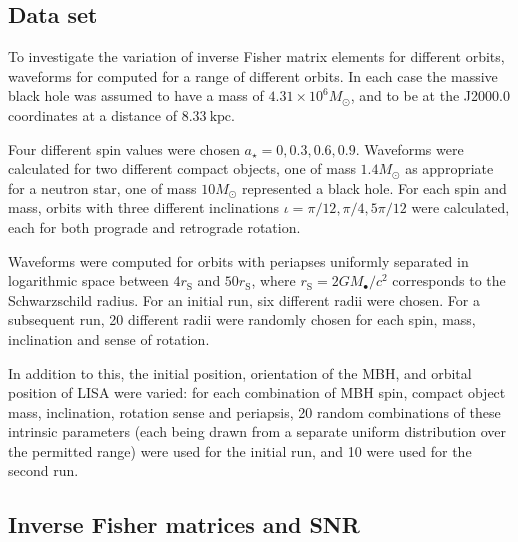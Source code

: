 \documentclass[useAMS,usedcolumn,usegraphicx,usenatbib]{mn2e}
\newcommand{\eqnref}[1]{(\ref{eq:#1})}
\newcommand{\sub}[1]{\ensuremath{_\mathrm{#1}}}
\begin{document}
\subsection{Data set}

To investigate the variation of inverse Fisher matrix elements for different orbits, waveforms for computed for a range of different orbits. In each case the massive black hole was assumed to have a mass of $4.31 \times 10^6 M_\odot$, and to be at the J2000.0 coordinates at a distance of $8.33~\mathrm{kpc}$.

Four different spin values were chosen $a_\star = 0, 0.3, 0.6, 0.9$. Waveforms were calculated for two different compact objects, one of mass $1.4 M_\odot$ as appropriate for a neutron star, one of mass $10 M_\odot$ represented a black hole. For each spin and mass, orbits with three different inclinations $\iota = \pi/12, \pi/4, 5\pi/12$ were calculated, each for both prograde and retrograde rotation.

Waveforms were computed for orbits with periapses uniformly separated in logarithmic space between $4 r\sub{S}$ and $50 r\sub{S}$, where $r\sub{S} = 2 GM_\bullet / c^2$ corresponds to the Schwarzschild radius. For an initial run, six different radii were chosen. For a subsequent run, 20 different radii were randomly chosen for each spin, mass, inclination and sense of rotation.

In addition to this, the initial position, orientation of the MBH, and orbital position of LISA were varied: for each combination of MBH spin, compact object mass, inclination, rotation sense and periapsis, 20 random combinations of these intrinsic parameters (each being drawn from a separate uniform distribution over the permitted range) were used for the initial run, and 10 were used for the second run.

\subsection{Inverse Fisher matrices and SNR}

\end{document}
